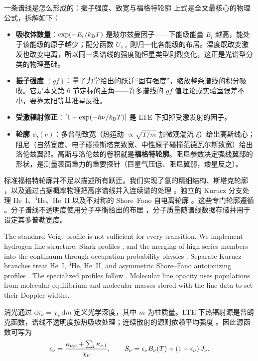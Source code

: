 \begin{physbox}{一条谱线是怎么形成的：振子强度、致宽与福格特轮廓}
上式是全文最核心的物理公式，拆解如下：
\begin{itemize}
\item \textbf{吸收体数量}：$\exp(-E_l/k_{\rm B}T)$ 是玻尔兹曼因子——下能级能量 $E_l$ 越高，能处于该能级的原子越少；配分函数 $U_{s,r}$ 则归一化各能级的布居。温度既改变激发也改变电离，所以同一条谱线的强度随恒星类型剧烈变化，这正是光谱型分类的物理基础。
\item \textbf{振子强度 $(gf)$}：量子力学给出的跃迁“固有强度”，缩放整条谱线的积分吸收。它是本文第 6 节定标的主角——许多谱线的 $gf$ 值理论或实验室误差不小，要靠太阳等基准星反推。
\item \textbf{受激辐射修正}：$[1-\exp(-h\nu/k_{\rm B}T)]$ 是 LTE 下扣掉受激发射的因子。
\item \textbf{轮廓 $\phi_l(\nu)$}：多普勒致宽（热运动 $\propto\sqrt{T/m}$ 加微观湍流 $\xi$）给出高斯线心；阻尼（自然宽度、电子碰撞斯塔克致宽、中性原子碰撞范德瓦尔斯致宽）给出洛伦兹翼部。高斯与洛伦兹的卷积就是\textbf{福格特轮廓}。阻尼参数决定强线翼部的形状，是测量表面重力的重要探针（巨星气压低、阻尼翼弱，矮星反之）。
\end{itemize}
\end{physbox}

标准福格特轮廓并不足以描述所有跃迁。我们实现了氢的精细结构、斯塔克轮廓 \citep{VidalCooperSmith1973}，以及通过占据概率物理把高序谱线并入连续谱的处理 \citep{HummerMihalas1988}。独立的 Kurucz 分支处理 He~I、$^3$He、He~II 以及不对称的 Shore--Fano 自电离轮廓 \citep{Fano1961,Shore1967}。这些专门轮廓遵循 \citet{KuruczAvrett1981}。分子谱线不透明度使用分子平衡给出的布居 \citep{Tsuji1973}，分子质量随谱线数据存储并用于设定其多普勒宽度。

\begin{EN}
The standard Voigt profile is not sufficient for every transition. We
implement hydrogen fine structure, Stark profiles
\citep{VidalCooperSmith1973}, and the merging of high series members into the
continuum through occupation-probability physics \citep{HummerMihalas1988}.
Separate Kurucz branches treat He~I, $^3$He, He~II, and asymmetric
Shore--Fano autoionizing profiles \citep{Fano1961,Shore1967}. The specialized
profiles follow \citet{KuruczAvrett1981}.
Molecular line opacity uses populations from molecular equilibrium
\citep{Tsuji1973} and molecular masses stored with the line data
to set their Doppler widths.
\end{EN}

消光通过 $\mathrm{d}\tau_\nu=\chi_\nu\,\mathrm{d}m$ 定义光学深度，其中 $m$ 为柱质量。LTE 下热辐射源是普朗克函数，谱线不透明度按热吸收处理；连续散射的源则依赖平均强度 \citep{Mihalas1978,Sobeck2011}。因此源函数可写为
\begin{equation}
\epsilon_\nu =
\frac{\kappa_{\nu,{\rm c}}+\sum_l\kappa_{\nu,l}}{\chi_\nu},
\qquad
S_\nu = \epsilon_\nu B_\nu(T)
      + \left(1-\epsilon_\nu\right)J_\nu .
\end{equation}

